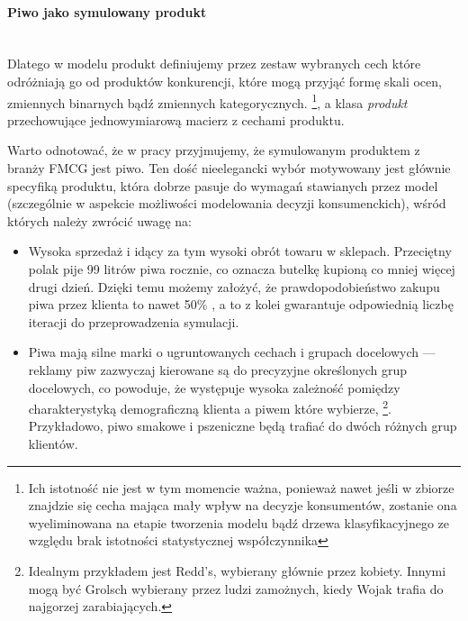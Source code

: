 \documentclass[polish, twoside, 12pt, a4paper]{article}
\theoremstyle{definition}
\theoremstyle{plain}
\theoremstyle{remark}
\begin{document}
\paragraph{Piwo jako symulowany produkt}\mbox{}\\

Dlatego w modelu produkt definiujemy przez zestaw wybranych cech które odróżniają go od produktów konkurencji, które mogą przyjąć formę skali ocen, zmiennych binarnych bądź zmiennych kategorycznych. \footnote{Ich istotność nie jest w tym momencie ważna, ponieważ nawet jeśli w zbiorze znajdzie się cecha mająca mały wpływ na decyzje konsumentów, zostanie ona wyeliminowana na etapie tworzenia modelu bądź drzewa klasyfikacyjnego ze względu brak istotności statystycznej współczynnika}, a klasa \textit{produkt} przechowujące jednowymiarową macierz z cechami produktu.

Warto odnotować, że w pracy przyjmujemy, że symulowanym produktem z branży FMCG jest piwo. Ten dość nieelegancki wybór motywowany jest głównie specyfiką produktu, która dobrze pasuje do wymagań stawianych przez model (szczególnie w aspekcie możliwości modelowania decyzji konsumenckich), wśród których należy zwrócić uwagę na:

	\begin{itemize}
			\item Wysoka sprzedaż i idący za tym wysoki obrót towaru w sklepach. Przeciętny polak pije 99 litrów piwa rocznie, co oznacza butelkę kupioną co mniej więcej drugi dzień. Dzięki temu możemy założyć, że prawdopodobieństwo zakupu piwa przez klienta to nawet 50\% , a to z kolei gwarantuje odpowiednią liczbę iteracji do przeprowadzenia symulacji. 
			\item Piwa mają silne marki o ugruntowanych cechach i grupach docelowych --- reklamy piw zazwyczaj kierowane są do precyzyjne określonych grup docelowych, co powoduje, że występuje wysoka zależność pomiędzy charakterystyką demograficzną klienta a piwem które wybierze, \footnote{Idealnym przykładem jest Redd's, wybierany głównie przez kobiety. Innymi mogą być Grolsch wybierany przez ludzi zamożnych, kiedy Wojak trafia do najgorzej zarabiających.}.  Przykładowo, piwo smakowe i pszeniczne będą trafiać do dwóch różnych grup klientów.
	\end{itemize}
\end{document}
